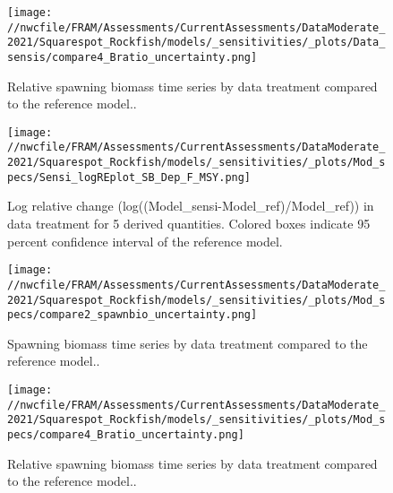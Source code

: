 \documentclass[11pt,
  english,
  a4paper,
]{article}
\begin{document}
\begin{figure}
\centering
\texttt{[image: //nwcfile/FRAM/Assessments/CurrentAssessments/DataModerate\_2021/Squarespot\_Rockfish/models/\_sensitivities/\_plots/Data\_sensis/compare4\_Bratio\_uncertainty.png]}
\caption{Relative spawning biomass time series by data treatment compared to the reference model..\label{fig:sensi-data-depl}}
\end{figure}

\tagmcend\tagstructend


\begin{figure}
\centering
\texttt{[image: //nwcfile/FRAM/Assessments/CurrentAssessments/DataModerate\_2021/Squarespot\_Rockfish/models/\_sensitivities/\_plots/Mod\_specs/Sensi\_logREplot\_SB\_Dep\_F\_MSY.png]}
\caption{Log relative change (log((Model\_sensi-Model\_ref)/Model\_ref)) in data treatment for 5 derived quantities. Colored boxes indicate 95 percent confidence interval of the reference model.\label{fig:sensi-modspec-RE}}
\end{figure}

\tagmcend\tagstructend


\begin{figure}
\centering
\texttt{[image: //nwcfile/FRAM/Assessments/CurrentAssessments/DataModerate\_2021/Squarespot\_Rockfish/models/\_sensitivities/\_plots/Mod\_specs/compare2\_spawnbio\_uncertainty.png]}
\caption{Spawning biomass time series by data treatment compared to the reference model..\label{fig:sensi-modspec-ssb}}
\end{figure}

\tagmcend\tagstructend


\begin{figure}
\centering
\texttt{[image: //nwcfile/FRAM/Assessments/CurrentAssessments/DataModerate\_2021/Squarespot\_Rockfish/models/\_sensitivities/\_plots/Mod\_specs/compare4\_Bratio\_uncertainty.png]}
\caption{Relative spawning biomass time series by data treatment compared to the reference model..\label{fig:sensi-modspec-depl}}
\end{figure}
\end{document}
